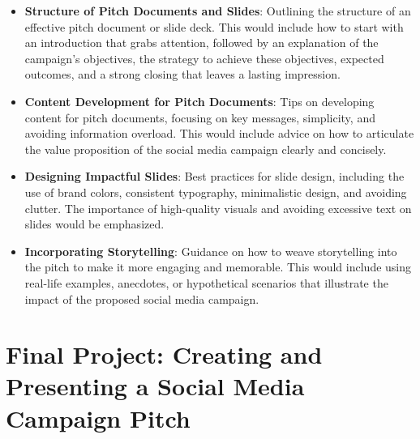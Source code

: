 \documentclass[
]{book}
\providecommand{\tightlist}{%
  \setlength{\itemsep}{0pt}\setlength{\parskip}{0pt}}
\begin{document}
\begin{itemize}
\tightlist
\item
  \textbf{Structure of Pitch Documents and Slides}: Outlining the structure of an effective pitch document or slide deck. This would include how to start with an introduction that grabs attention, followed by an explanation of the campaign's objectives, the strategy to achieve these objectives, expected outcomes, and a strong closing that leaves a lasting impression.
\item
  \textbf{Content Development for Pitch Documents}: Tips on developing content for pitch documents, focusing on key messages, simplicity, and avoiding information overload. This would include advice on how to articulate the value proposition of the social media campaign clearly and concisely.
\item
  \textbf{Designing Impactful Slides}: Best practices for slide design, including the use of brand colors, consistent typography, minimalistic design, and avoiding clutter. The importance of high-quality visuals and avoiding excessive text on slides would be emphasized.
\item
  \textbf{Incorporating Storytelling}: Guidance on how to weave storytelling into the pitch to make it more engaging and memorable. This would include using real-life examples, anecdotes, or hypothetical scenarios that illustrate the impact of the proposed social media campaign.
\end{itemize}

\hypertarget{final-project-creating-and-presenting-a-social-media-campaign-pitch}{%
\section*{Final Project: Creating and Presenting a Social Media Campaign Pitch}\label{final-project-creating-and-presenting-a-social-media-campaign-pitch}}
\end{document}
